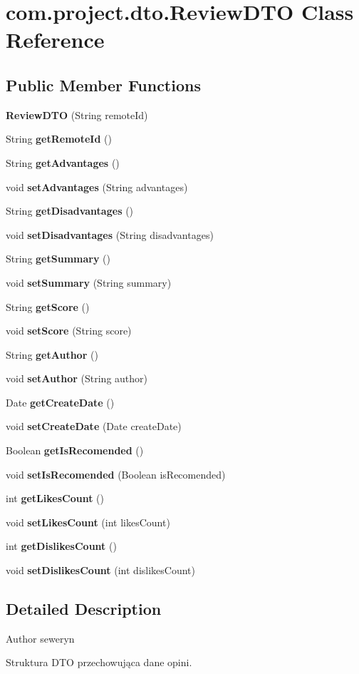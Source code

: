 \section{com.\+project.\+dto.\+Review\+D\+TO Class Reference}
\label{classcom_1_1project_1_1dto_1_1_review_d_t_o}
\subsection*{Public Member Functions}
\begin{DoxyCompactItemize}
\item 
\textbf{ Review\+D\+TO} (String remote\+Id)
\item 
String \textbf{ get\+Remote\+Id} ()
\item 
String \textbf{ get\+Advantages} ()
\item 
void \textbf{ set\+Advantages} (String advantages)
\item 
String \textbf{ get\+Disadvantages} ()
\item 
void \textbf{ set\+Disadvantages} (String disadvantages)
\item 
String \textbf{ get\+Summary} ()
\item 
void \textbf{ set\+Summary} (String summary)
\item 
String \textbf{ get\+Score} ()
\item 
void \textbf{ set\+Score} (String score)
\item 
String \textbf{ get\+Author} ()
\item 
void \textbf{ set\+Author} (String author)
\item 
Date \textbf{ get\+Create\+Date} ()
\item 
void \textbf{ set\+Create\+Date} (Date create\+Date)
\item 
Boolean \textbf{ get\+Is\+Recomended} ()
\item 
void \textbf{ set\+Is\+Recomended} (Boolean is\+Recomended)
\item 
int \textbf{ get\+Likes\+Count} ()
\item 
void \textbf{ set\+Likes\+Count} (int likes\+Count)
\item 
int \textbf{ get\+Dislikes\+Count} ()
\item 
void \textbf{ set\+Dislikes\+Count} (int dislikes\+Count)
\end{DoxyCompactItemize}


\subsection{Detailed Description}
\begin{DoxyAuthor}{Author}
seweryn
\end{DoxyAuthor}
Struktura D\+TO przechowująca dane opini. 

